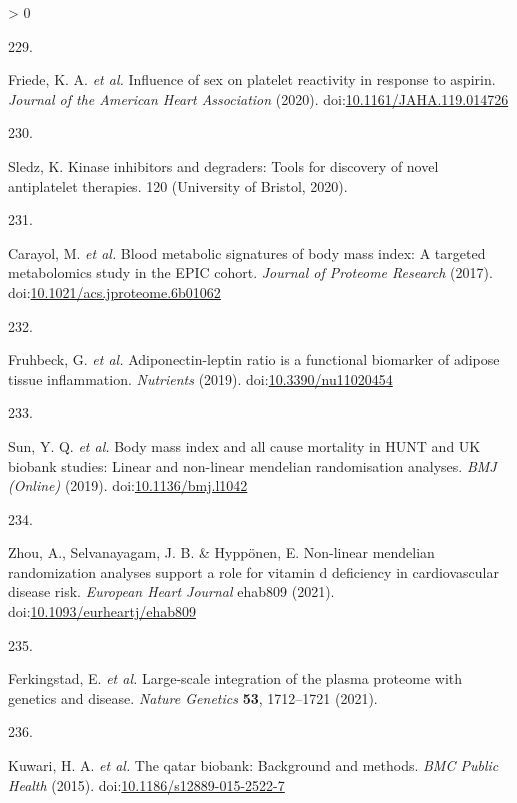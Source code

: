 \documentclass[11pt,twoside]{bristolthesis}
\newlength{\cslhangindent}
\newlength{\csllabelwidth}
\newenvironment{CSLReferences}[2] %
 {%
  \setlength{\parindent}{0pt}
  \ifodd #1 \everypar{\setlength{\hangindent}{\cslhangindent}}\ignorespaces\fi
  \ifnum #2 > 0
  \setlength{\parskip}{#2\baselineskip}
  \fi
 }%
 {}
\newcommand{\CSLLeftMargin}[1]{\parbox[t]{\csllabelwidth}{#1}}
\newcommand{\CSLRightInline}[1]{\parbox[t]{\linewidth - \csllabelwidth}{#1}\break}
\begin{document}
\begin{CSLReferences}{0}{0}
\leavevmode\hypertarget{ref-Friede2020}{}%
\CSLLeftMargin{229. }
\CSLRightInline{Friede, K. A. \emph{et al.} Influence of sex on platelet reactivity in response to aspirin. \emph{Journal of the American Heart Association} (2020). doi:\href{https://doi.org/10.1161/JAHA.119.014726}{10.1161/JAHA.119.014726}}

\leavevmode\hypertarget{ref-Sledz2020}{}%
\CSLLeftMargin{230. }
\CSLRightInline{Sledz, K. Kinase inhibitors and degraders: Tools for discovery of novel antiplatelet therapies. 120 (University of Bristol, 2020).}

\leavevmode\hypertarget{ref-Carayol2017c}{}%
\CSLLeftMargin{231. }
\CSLRightInline{Carayol, M. \emph{et al.} Blood metabolic signatures of body mass index: A targeted metabolomics study in the EPIC cohort. \emph{Journal of Proteome Research} (2017). doi:\href{https://doi.org/10.1021/acs.jproteome.6b01062}{10.1021/acs.jproteome.6b01062}}

\leavevmode\hypertarget{ref-Fruhbeck2019}{}%
\CSLLeftMargin{232. }
\CSLRightInline{Fruhbeck, G. \emph{et al.} Adiponectin-leptin ratio is a functional biomarker of adipose tissue inflammation. \emph{Nutrients} (2019). doi:\href{https://doi.org/10.3390/nu11020454}{10.3390/nu11020454}}

\leavevmode\hypertarget{ref-Sun2019}{}%
\CSLLeftMargin{233. }
\CSLRightInline{Sun, Y. Q. \emph{et al.} Body mass index and all cause mortality in HUNT and UK biobank studies: Linear and non-linear mendelian randomisation analyses. \emph{BMJ (Online)} (2019). doi:\href{https://doi.org/10.1136/bmj.l1042}{10.1136/bmj.l1042}}

\leavevmode\hypertarget{ref-Zhou2021}{}%
\CSLLeftMargin{234. }
\CSLRightInline{Zhou, A., Selvanayagam, J. B. \& Hyppönen, E. Non-linear mendelian randomization analyses support a role for vitamin d deficiency in cardiovascular disease risk. \emph{European Heart Journal} ehab809 (2021). doi:\href{https://doi.org/10.1093/eurheartj/ehab809}{10.1093/eurheartj/ehab809}}

\leavevmode\hypertarget{ref-Ferkingstad2021}{}%
\CSLLeftMargin{235. }
\CSLRightInline{Ferkingstad, E. \emph{et al.} Large-scale integration of the plasma proteome with genetics and disease. \emph{Nature Genetics} \textbf{53}, 1712--1721 (2021).}

\leavevmode\hypertarget{ref-AlKuwari2015}{}%
\CSLLeftMargin{236. }
\CSLRightInline{Kuwari, H. A. \emph{et al.} The qatar biobank: Background and methods. \emph{BMC Public Health} (2015). doi:\href{https://doi.org/10.1186/s12889-015-2522-7}{10.1186/s12889-015-2522-7}}


\end{CSLReferences}
\end{document}
